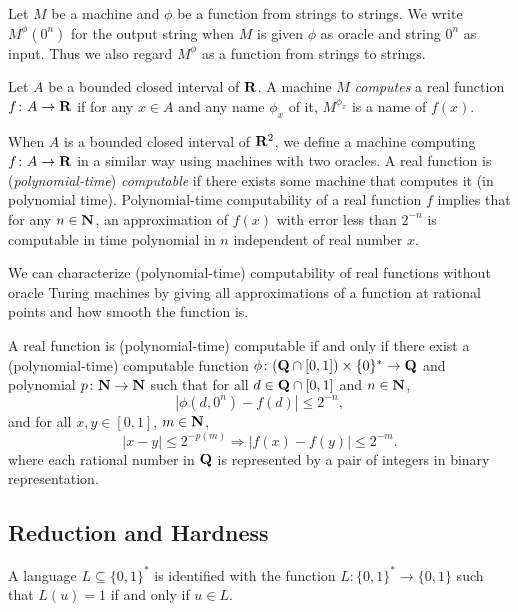 Let $M$ be a machine and $\phi$ be a function from strings to strings. 
We write $M ^\phi (0 ^n)$ for the output string 
when $M$ is given
$\phi$ as oracle and string $0^n$ as input.
Thus we also regard $M^\phi$ as a function from strings to strings.

\begin{definition}
Let $A$ be a bounded closed interval of $\mathbf R$.
A machine $M$ \emph{computes} a real function $f \colon A \to \mathbf R$ 
if for any $x \in A$ and any name $\phi_x$ of it,
$M^{\phi_x}$ is a name of $f(x)$.
\end{definition}

When $A$ is a bounded closed interval of $\mathbf R ^2$,
we define a machine computing $f \colon A \to \mathbf R$ in a similar way using machines with two oracles.
A real function is (\emph{polynomial-time}) \emph{computable} if there exists some machine that computes it (in polynomial time).
Polynomial-time computability of a real function $f$ implies that
for any $n \in \mathbf N$, 
an approximation of $f(x)$ with error less than $2^{-n}$
is computable in time polynomial in $n$ 
independent of real number $x$.

We can characterize (polynomial-time) computability of real functions without oracle Turing machines
by giving all approximations of a function at rational points 
and how smooth the function is.

\begin{lemma}
 \label{lem:type1representation}
 A real function is (polynomial-time) computable if and only if
 there exist a (polynomial-time) computable function 
 $\phi \colon (\mathbf Q \cap [0, 1]) \times \{0\} ^* \to \mathbf Q$ and 
 polynomial $p \colon \mathbf N \to \mathbf N$ such that
 for all $d \in \mathbf Q \cap [0,1]$ and $n \in \mathbf N$,
 \begin{equation}
  |\phi(d, 0^n) - f(d)| \le 2^{-n},
 \end{equation}
 and for all $x, y \in [0, 1]$, $m \in \mathbf N$,
 \begin{equation}
  |x-y| \le 2^{-p(m)} \Rightarrow |f(x) - f(y)| \le 2^{-m}.
 \end{equation}
 where each rational number in $\mathbf Q$ is represented by a pair of integers in binary representation.
\end{lemma}

\subsection{Reduction and Hardness}
A language $L \subseteq \{0, 1\} ^*$ is identified with the function
$L \colon \{0, 1\} ^* \to \{0, 1\}$ such that $L (u) = 1$ if and only if $u \in L$.

